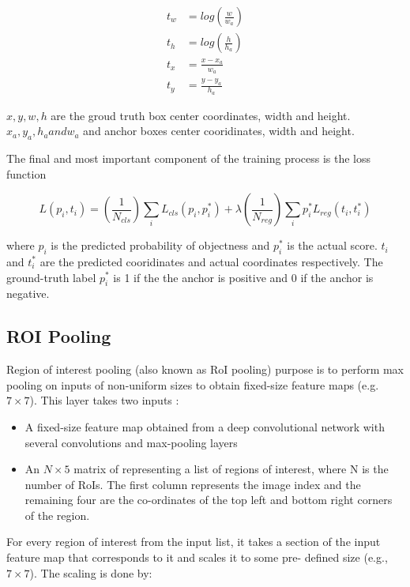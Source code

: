 \begin{align}
  t_{w} &= log(\frac{w}{w_{a}}) \\
  t_{h} &= log(\frac{h}{h_{a}}) \\
  t_{x} &= \frac{x - x_{a}}{w_{a}} \\
  t_{y} &= \frac{y - y_{a}}{h_{a}}
\end{align}

$x, y , w, h$ are the groud truth box center coordinates, width and height. $x_{a}, y_{a}, h_{a} and w_{a}$ and anchor boxes center cooridinates, width and height.

The final and most important component of the training process is the loss function

\begin{equation}
  L(p_{i},t_{i}) = (\frac{1}{N_{cls}}) \sum_{i}^{} L_{cls}(p_{i},p_{i}^{*}) + \lambda (\frac{1}{N_{reg}}) \sum_{i}^{} p_{i}^{*} L_{reg}(t_{i},t_{i}^{*})
\end{equation}

where $p_{i}$ is the predicted probability of objectness and $p_{i}^*$ is the actual score. $t_{i}$ and $t_{i}^*$ are the predicted cooridinates and actual coordinates respectively. The ground-truth label $p_{i}^*$ is 1 if the the anchor is positive and 0 if the anchor is negative.

\subsection{ROI Pooling}
Region of interest pooling (also known as RoI pooling) purpose is to perform max pooling on inputs of non-uniform sizes to obtain fixed-size feature maps (e.g. $7 \times 7$). This layer takes two inputs :

\begin{itemize}
	\item A fixed-size feature map obtained from a deep convolutional network with several convolutions and max-pooling layers
	\item An $N \times 5$ matrix of representing a list of regions of interest, where N is the number of RoIs. The first column represents the image index and the remaining four are the co-ordinates of the top left and bottom right corners of the region.
\end{itemize}

For every region of interest from the input list, it takes a section of the input feature map that corresponds to it and scales it to some pre-
defined size (e.g., $7 \times 7$). The scaling is done by:

